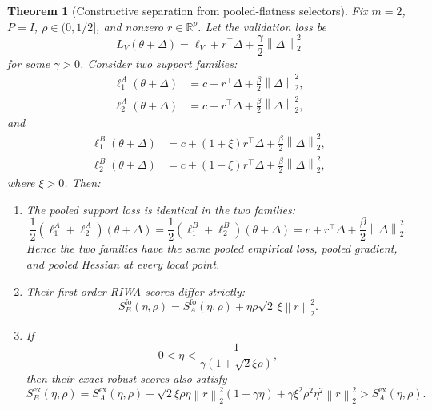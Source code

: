 \documentclass{article}
\newtheorem{theorem}{Theorem}
\newcommand{\RR}{\mathbb{R}}
\newcommand{\riwa}{\textup{\textsc{RIWA}}}
\newcommand{\norm}[1]{\left\lVert #1 \right\rVert}
\begin{document}
\begin{theorem}[Constructive separation from pooled-flatness selectors]
\label{thm:separation}
Fix $m=2$, $P=I$, $\rho \in (0,1/2]$, and nonzero $r \in \RR^p$. Let the validation loss be
\begin{equation}
    L_V(\theta + \Delta)
    =
    \ell_V + r^\top \Delta + \frac{\gamma}{2}\norm{\Delta}_2^2
\end{equation}
for some $\gamma > 0$. Consider two support families:
\begin{align}
    \ell_1^{A}(\theta+\Delta) &= c + r^\top \Delta + \frac{\beta}{2}\norm{\Delta}_2^2,\\
    \ell_2^{A}(\theta+\Delta) &= c + r^\top \Delta + \frac{\beta}{2}\norm{\Delta}_2^2,
\end{align}
and
\begin{align}
    \ell_1^{B}(\theta+\Delta) &= c + (1+\xi) r^\top \Delta + \frac{\beta}{2}\norm{\Delta}_2^2,\\
    \ell_2^{B}(\theta+\Delta) &= c + (1-\xi) r^\top \Delta + \frac{\beta}{2}\norm{\Delta}_2^2,
\end{align}
where $\xi > 0$.
Then:
\begin{enumerate}[label=(\roman*), leftmargin=1.5em]
    \item The pooled support loss is identical in the two families:
    \begin{equation}
        \frac{1}{2}\left(\ell_1^A + \ell_2^A\right)(\theta+\Delta)
        =
        \frac{1}{2}\left(\ell_1^B + \ell_2^B\right)(\theta+\Delta)
        =
        c + r^\top \Delta + \frac{\beta}{2}\norm{\Delta}_2^2.
    \end{equation}
    Hence the two families have the same pooled empirical loss, pooled gradient, and pooled Hessian at every local point.
    \item Their first-order \riwa{} scores differ strictly:
    \begin{equation}
        S_{B}^{\mathrm{fo}}(\eta,\rho)
        =
        S_{A}^{\mathrm{fo}}(\eta,\rho)
        +
        \eta \rho \sqrt{2}\,\xi \norm{r}_2^2.
        \label{eq:first_gap}
    \end{equation}
    \item If
    \begin{equation}
        0 < \eta < \frac{1}{\gamma(1+\sqrt{2}\xi\rho)},
        \label{eq:eta_condition}
    \end{equation}
    then their exact robust scores also satisfy
    \begin{equation}
        S_{B}^{\mathrm{ex}}(\eta,\rho)
        =
        S_{A}^{\mathrm{ex}}(\eta,\rho)
        +
        \sqrt{2}\xi\rho \eta \norm{r}_2^2(1-\gamma\eta)
        +
        \gamma \xi^2 \rho^2 \eta^2 \norm{r}_2^2
        >
        S_{A}^{\mathrm{ex}}(\eta,\rho).
        \label{eq:exact_gap}
    \end{equation}
\end{enumerate}
\end{theorem}
\end{document}
